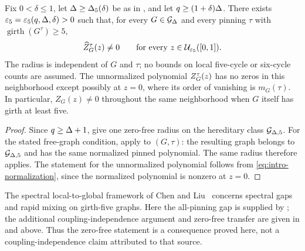 \begin{theorem}
\label{thm:unrestricted-girth5}
Fix $0<\delta\le1$, let $\Delta\ge\Delta_5(\delta)$ be as in
, and let $q\ge(1+\delta)\Delta$.
There exists $\varepsilon_5=\varepsilon_5(q,\Delta,\delta)>0$ such that, for every
$G\in\mathcal{G}_{\Delta}$ and every pinning $\tau$ with
$\operatorname{girth}(G^\tau)\ge5$,
\[
 \widehat Z_{G}^{\tau}(z)\ne0
 \qquad\text{for every }z\in\mathcal U_{\varepsilon_5}([0,1]).
\]
The radius is independent of $G$ and $\tau$; no bounds on local
five-cycle or six-cycle counts are assumed.
The unnormalized polynomial $Z_{G}^{\tau}(z)$ has no zeros in this
neighborhood except possibly at $z=0$, where its order of vanishing is
$m_G(\tau)$.  In particular, $Z_G(z)\ne0$ throughout the same
neighborhood when $G$ itself has girth at least five.
\end{theorem}
\begin{proof}
Since $q\ge\Delta+1$,  give
one zero-free radius on the hereditary class $\mathcal{G}_{\Delta,5}$.
For the stated free-graph condition, apply
 to $(G,\tau)$: the resulting graph
belongs to $\mathcal{G}_{\Delta,5}$ and has the same normalized pinned polynomial.
The same radius therefore applies.  The statement for the unnormalized
polynomial follows from \eqref{eq:intro-normalization}, since the normalized
polynomial is nonzero at $z=0$.
\end{proof}

\begin{remark}
The spectral local-to-global framework of Chen and
Liu~\cite{ChenLiu2026LocalGlobal} concerns spectral gaps and rapid mixing
on girth-five graphs.  Here the all-pinning gap is supplied by
; the additional coupling-independence argument
and zero-free transfer are given in  and above.
Thus the zero-free statement is a consequence proved here, not a
coupling-independence claim attributed to that source.
\end{remark}
